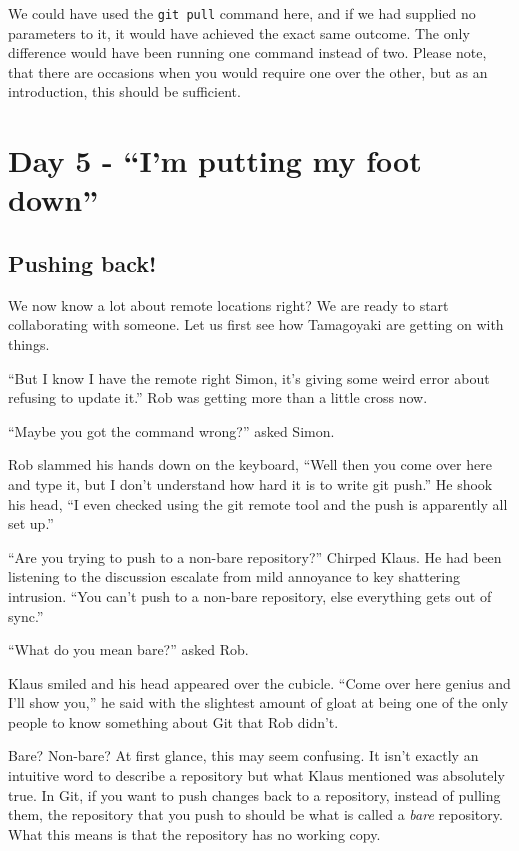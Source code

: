 We could have used the \texttt{git pull} command here, and if we had supplied no parameters to it, it would have achieved the exact same outcome.  The only difference would have been running one command instead of two.  Please note, that there are occasions when you would require one over the other, but as an introduction, this should be sufficient.

\section{Day 5 - ``I'm putting my foot down''}
\subsection{Pushing back!}

We now know a lot about remote locations right?  We are ready to start collaborating with someone.  Let us first see how Tamagoyaki are getting on with things.

\begin{trenches}
``But I know I have the remote right Simon, it's giving some weird error about refusing to update it.''  Rob was getting more than a little cross now.  

``Maybe you got the command wrong?'' asked Simon.

Rob slammed his hands down on the keyboard, ``Well then you come over here and type it, but I don't understand how hard it is to write git push.''  He shook his head, ``I even checked using the git remote tool and the push is apparently all set up.''

``Are you trying to push to a non-bare repository?'' Chirped Klaus.  He had been listening to the discussion escalate from mild annoyance to key shattering intrusion.  ``You can't push to a non-bare repository, else everything gets out of sync.''

``What do you mean bare?'' asked Rob.

Klaus smiled and his head appeared over the cubicle.  ``Come over here genius and I'll show you,'' he said with the slightest amount of gloat at being one of the only people to know something about Git that Rob didn't.
\end{trenches}

Bare?  Non-bare?  At first glance, this may seem confusing.  It isn't exactly an intuitive word to describe a repository but what Klaus mentioned was absolutely true.  In Git, if you want to push changes back to a repository, instead of pulling them, the repository that you push to should be what is called a \emph{bare} repository.  What this means is that the repository has no working copy.

